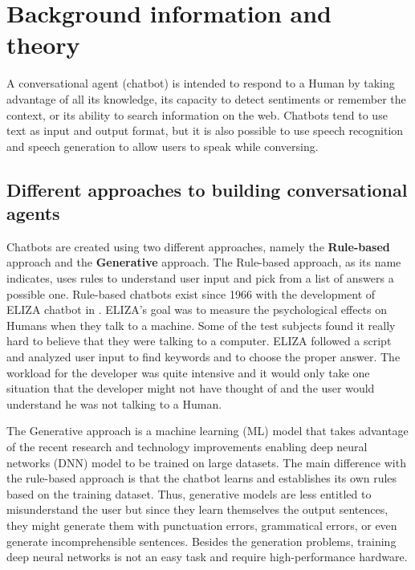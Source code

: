 
\chapter{Background information and theory} %

\label{Chapter2} %

A conversational agent (chatbot) is intended to respond to a Human by taking advantage of all its knowledge, its capacity to detect sentiments or remember the context, or its ability to search information on the web. Chatbots tend to use text as input and output format, but it is also possible to use speech recognition and speech generation to allow users to speak while conversing.

\section{Different approaches to building conversational agents}
Chatbots are created using two different approaches, namely the \textbf{Rule-based} approach and the \textbf{Generative} approach. The Rule-based approach, as its name indicates, uses rules to understand user input and pick from a list of answers a possible one. Rule-based chatbots exist since 1966 with the development of ELIZA chatbot in \citet{Weizenbaum:1966:ECP:365153.365168}. ELIZA's goal was to measure the psychological effects on Humans when they talk to a machine. Some of the test subjects found it really hard to believe that they were talking to a computer. ELIZA followed a script and analyzed user input to find keywords and to choose the proper answer. The workload for the developer was quite intensive and it would only take one situation that the developer might not have thought of and the user would understand he was not talking to a Human.

The Generative approach is a machine learning (ML) model that takes advantage of the recent research and technology improvements enabling deep neural networks (DNN) model to be trained on large datasets. The main difference with the rule-based approach is that the chatbot learns and establishes its own rules based on the training dataset. Thus, generative models are less entitled to misunderstand the user but since they learn themselves the output sentences, they might generate them with punctuation errors, grammatical errors, or even generate incomprehensible sentences. Besides the generation problems, training deep neural networks is not an easy task and require high-performance hardware.

